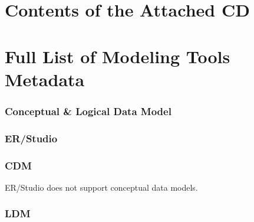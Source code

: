 \documentclass[12pt,a4paper]{report}
\begin{document}
\section{Contents of the Attached CD}




\section{Full List of Modeling Tools Metadata}
\label{full_list_metadata}

\subsubsection{Conceptual \& Logical Data Model}

\subsubsection{ER/Studio}

\subsubsection{CDM}

ER/Studio does not support conceptual data models.

\subsubsection{LDM}
\end{document}
